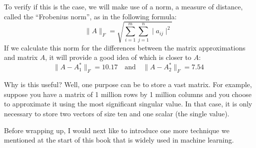\documentclass[600paper, 11pt,twoside,openany]{kdp}
\begin{document}
\indent To verify if this is the case, we will make use of a norm, a measure of distance, called the “Frobenius norm”, as in the following formula:
\[
\lVert A \rVert_F = \sqrt{\sum_{i=1}^m \sum_{j=1}^n \mid a_{ij} \mid^2}
\]
\indent If we calculate this norm for the differences between the matrix approximations and matrix $A$, it will provide a good idea of which is closer to $A$:
\[\lVert A - A_1^* \rVert_F = 10.17 \quad \textrm{and} \quad  \lVert A - A_2^* \rVert_F = 7.54\]
\par 
\vspace{-3pt}
\indent Why is this useful? Well, one purpose can be to store a vast matrix. For example, suppose you have a matrix of 1 million rows by 1 million columns and you choose to approximate it using the most significant singular value. In that case, it is only necessary to store two vectors of size ten and one scalar (the single value). 
\par 
\vspace{-3pt}
\indent Before wrapping up, I would next like to introduce one more technique we mentioned at the start of this book that is widely used in machine learning.
\end{document}
